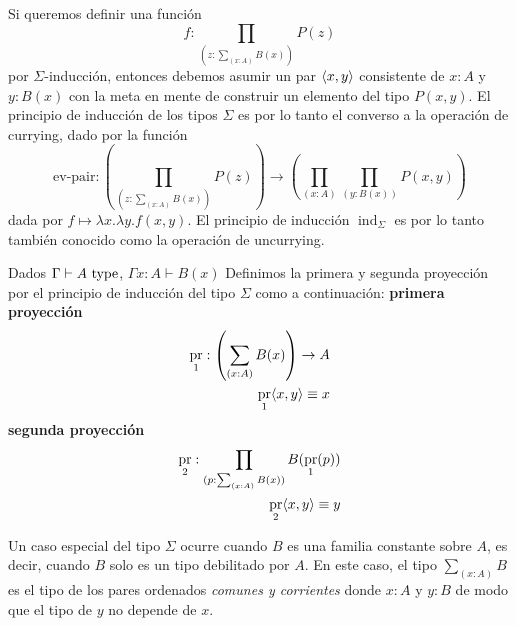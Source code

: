 \documentclass{article}
\DeclareMathOperator{\ind}{ind}
\DeclareMathOperator{\pr}{pr}
\begin{document}
    \begin{remark}
         Si queremos definir una función
         $$
            f : \prod_{(z : \sum_{(x : A)} B(x))} P(z)
         $$
         por $\Sigma$-inducción, entonces debemos asumir un par $\langle x, y \rangle$
         consistente de $x : A$ y $y : B(x)$ con la meta en mente de construir
         un elemento del tipo $P(x,y)$. El principio de inducción de los tipos
         $\Sigma$ es por lo tanto el converso a la operación de currying, dado
         por la función
         $$
            \text{ev-pair} : \left(
                \prod_{(z : \sum_{(x : A)} B(x))} P(z)
            \right)
            \rightarrow
            \left(
                \prod_{(x : A)}\prod_{(y : B(x))} P(x, y)
            \right)
         $$
         dada por $f \mapsto \lambda x. \lambda y . f(x, y )$. El principio de
         inducción $\ind_\Sigma$ es por lo tanto también conocido como la
         operación de uncurrying.
    \end{remark}
    
    \begin{definition}
        Dados $\Gamma \vdash A\ \mathrm{type}$, $\Gamma x : A \vdash B(x)$
        Definimos la primera y segunda proyección por el principio de inducción
        del tipo $\Sigma$ como a continuación:
        \hfill\newline\textbf{primera proyección}\hfill\newline
        \begin{align*}
            \pr_1 : \left(\sum_{(x : A)} B(x)\right) \rightarrow A\\
            \pr_1\picopar{x,y} \equiv x
        \end{align*}
        \hfill\newline\textbf{segunda proyección}\hfill\newline
        \begin{align*}
            \pr_2 : \prod_{(p : \sum_{(x : A)} B(x))} B(\pr_1(p))\\
            \pr_2\picopar{x,y} \equiv y
        \end{align*}
    \end{definition}

    Un caso especial del tipo $\Sigma$ ocurre cuando $B$ es una familia 
    constante sobre $A$, es decir, cuando $B$ solo es un tipo debilitado por $A$.
    En este caso, el tipo $\sum_{(x : A)} B$ es el tipo de los pares ordenados
    \textit{comunes y corrientes} donde $x : A$ y $y : B$ de modo que el tipo
    de $y$ no depende de $x$.
\end{document}
